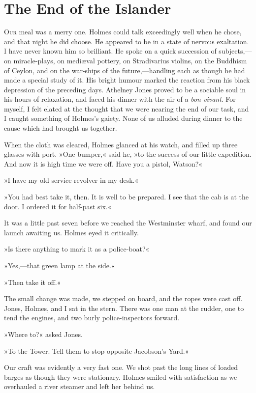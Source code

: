\chapter{The End of the Islander}
\lettrine[lines=4]{O}{ur} meal was a merry one. Holmes could talk exceedingly well when he chose, and that night he did choose. He appeared to be in a state of nervous exaltation. I have never known him so brilliant. He spoke on a quick succession of subjects,—on miracle-plays, on mediæval pottery, on Stradivarius violins, on the Buddhism of Ceylon, and on the war-ships of the future,—handling each as though he had made a special study of it. His bright humour marked the reaction from his black depression of the preceding days. Athelney Jones proved to be a sociable soul in his hours of relaxation, and faced his dinner with the air of a \textit{bon vivant}. For myself, I felt elated at the thought that we were nearing the end of our task, and I caught something of Holmes's gaiety. None of us alluded during dinner to the cause which had brought us together.

When the cloth was cleared, Holmes glanced at his watch, and filled up three glasses with port. »One bumper,« said he, »to the success of our little expedition. And now it is high time we were off. Have you a pistol, Watson?«

»I have my old service-revolver in my desk.«

»You had best take it, then. It is well to be prepared. I see that the cab is at the door. I ordered it for half-past six.«

It was a little past seven before we reached the Westminster wharf, and found our launch awaiting us. Holmes eyed it critically.

»Is there anything to mark it as a police-boat?«

»Yes,—that green lamp at the side.«

»Then take it off.«

The small change was made, we stepped on board, and the ropes were cast off. Jones, Holmes, and I sat in the stern. There was one man at the rudder, one to tend the engines, and two burly police-inspectors forward.

»Where to?« asked Jones.

»To the Tower. Tell them to stop opposite Jacobson's Yard.«

Our craft was evidently a very fast one. We shot past the long lines of loaded barges as though they were stationary. Holmes smiled with satisfaction as we overhauled a river steamer and left her behind us.

